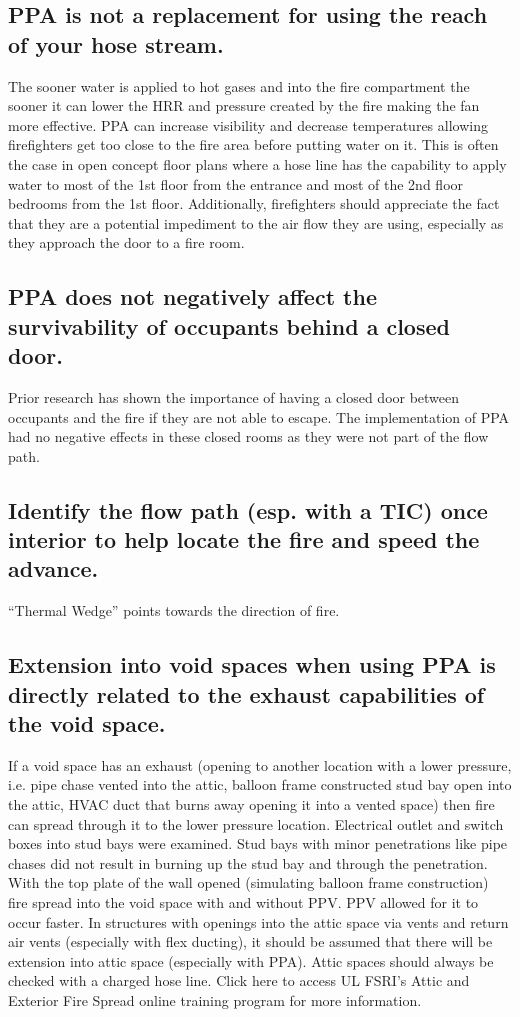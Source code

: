 \documentclass{article}
\begin{document}
\subsection{PPA is not a replacement for using the reach of your hose stream.}
The sooner water is applied to hot gases and into the fire compartment the sooner it can lower the HRR and pressure created by the fire making the fan more effective.  PPA can increase visibility and decrease temperatures allowing firefighters get too close to the fire area before putting water on it.    This is often the case in open concept floor plans where a hose line has the capability to apply water to most of the 1st floor from the entrance and most of the 2nd floor bedrooms from the 1st floor.  Additionally, firefighters should appreciate the fact that they are a potential impediment to the air flow they are using, especially as they approach the door to a fire room. 

\subsection{PPA does not negatively affect the survivability of occupants behind a closed door.}
Prior research has shown the importance of having a closed door between occupants and the fire if they are not able to escape.  The implementation of PPA had no negative effects in these closed rooms as they were not part of the flow path.  

\subsection{Identify the flow path (esp. with a TIC) once interior to help locate the fire and speed the advance.}
“Thermal Wedge” points towards the direction of fire.

\subsection{Extension into void spaces when using PPA is directly related to the exhaust capabilities of the void space.}
If a void space has an exhaust (opening to another location with a lower pressure, i.e. pipe chase vented into the attic, balloon frame constructed stud bay open into the attic, HVAC duct that burns away opening it into a vented space) then fire can spread through it to the lower pressure location.  Electrical outlet and switch boxes into stud bays were examined.  Stud bays with minor penetrations like pipe chases did not result in burning up the stud bay and through the penetration.  With the top plate of the wall opened (simulating balloon frame construction) fire spread into the void space with and without PPV.  PPV allowed for it to occur faster.  In structures with openings into the attic space via vents and return air vents (especially with flex ducting), it should be assumed that there will be extension into attic space (especially with PPA).  Attic spaces should always be checked with a charged hose line.  Click here to access UL FSRI’s Attic and Exterior Fire Spread online training program for more information.
\end{document}
